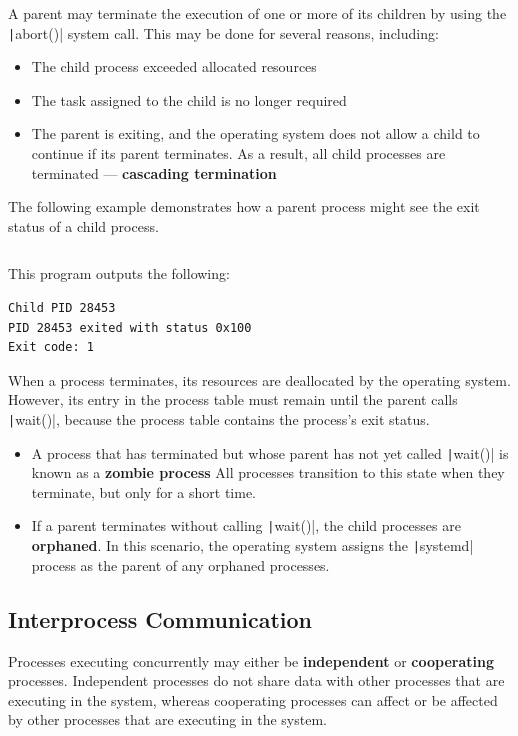 \documentclass{article}
\begin{document}
A parent may terminate the execution of one or more of its children by
using the \texttt|abort()| system call. This may be done for
several reasons, including:
\begin{itemize}
    \item The child process exceeded allocated resources
    \item The task assigned to the child is no longer required
    \item The parent is exiting, and the operating system does not
          allow a child to continue if its parent terminates. As a
          result, all child processes are terminated ---
          \textbf{cascading termination}
\end{itemize}
The following
example demonstrates how a parent process might see the exit
status of a child process.
\inputminted{c}{code/terminate_process.c}
This program outputs the following:
\begin{verbatim}
Child PID 28453
PID 28453 exited with status 0x100
Exit code: 1
\end{verbatim}
When a process terminates, its resources are deallocated by the
operating system. However, its entry in the process table must remain
until the parent calls \texttt|wait()|, because the process
table contains the process's exit status.
\begin{itemize}
    \item A process that has terminated but whose parent has not yet
          called \texttt|wait()| is known as a \textbf{zombie
          process} All processes transition to this state when they
          terminate, but only for a short time.
    \item If a parent terminates without calling
          \texttt|wait()|, the child processes are
          \textbf{orphaned}. In this scenario, the operating system
          assigns the \texttt|systemd| process as the parent
          of any orphaned processes.
\end{itemize}
\subsection{Interprocess Communication}
Processes executing concurrently may either be \textbf{independent} or
\textbf{cooperating} processes. Independent processes do not share data
with other processes that are executing in the system, whereas
cooperating processes can affect or be affected by other processes that
are executing in the system.
\end{document}
